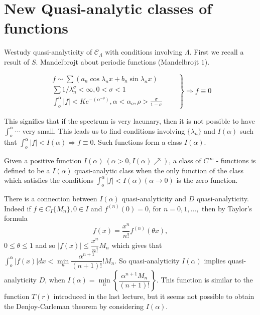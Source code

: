 \chapter{New Quasi-analytic classes of functions}\label{chap20}%

We\pageoriginale study quasi-analyticity of $\mathscr{C}_\Lambda$ with conditions
involving $\Lambda$. First we recall a result of $S$. Mandelbrojt
about periodic functions (Mandelbrojt $1$). 

\begin{equation*}
  \left.
  \begin{aligned}
    f \sim \sum (a_n \cos \lambda_n x + b_n \sin \lambda_n x)&\quad \\
    \sum {1/ \lambda^\sigma_n} < \infty, 0 < \sigma < 1&\\
    \int^\alpha_o | f | < K e^{-(\alpha^{- \rho})}, \alpha <
    \alpha_o, \rho > \frac{\sigma}{1-\sigma} &
  \end{aligned}
  \right \}
  \Rightarrow f \equiv 0
\end{equation*}

This signifies that if the spectrum is very lacunary, then it is not
possible to have $\int^\alpha_o \cdots$ very small. This leads us to
find conditions involving $\{\lambda_n\}$ and $I (\alpha)$ such that
$\int^\alpha_o | f| < I (\alpha) \Rightarrow f \equiv 0$. Such
functions form a class $I (\alpha)$. 

\begin{defi*}%
 Given a positive function $I (\alpha) ~ (\alpha > 0, I (\alpha)
 \nearrow)$, a class of $C^\infty$ - functions is defined to be a $I
 (\alpha)$ quasi-analytic class when the only function of the class
 which satisfies the conditions $\int^\alpha_o | f| < I (\alpha)
 (\alpha \to 0)$ is the zero function. 
 
 There is a connection between $I(\alpha)$ quasi-analyticity and $D$
 quasi-analyticity. Indeed if $f \in C_I \{M_n\}, 0 \in I$ and
 $f^{(n)} (0) = 0$, for $n = 0, 1, \ldots, $ then by Taylor's
 formula 
 $$
 f(x) = \frac{x^n}{n !} f^{(n)} (\theta x),
 $$
 $0 \le \theta \le 1$ and so $\big | f (x) \big | \le \dfrac{x^n}{n
 !} M_n$ which gives that $\int^\alpha_o \big | f(x) \big | dx <
 \min\limits_{n} \dfrac{\alpha^{n+1}}{(n+1)!} ! M_n$. So
 quasi-analyticity $I (\alpha)$ implies quasi-analyticity $D$, when
 $I (\alpha) = \min\limits_{n}
 \left\{\dfrac{\alpha^{n+1}M_n}{(n+1)!}\right\}$. This function is
 similar to the function $T(r)$ introduced\pageoriginale 
 in the last lecture, but it seems not possible to obtain the
 Denjoy-Carleman theorem by considering $I(\alpha)$. 
\end{defi*}

